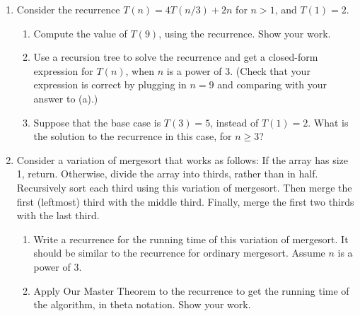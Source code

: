 \documentclass{article}
\begin{document}
\begin{enumerate}
    \item Consider the recurrence $T(n) = 4T(n/3) + 2n$ for $n > 1$, and $T(1) = 2$.
    \begin{enumerate}
        \item Compute the value of $T(9)$, using the recurrence. Show your work.
        \item Use a recursion tree to solve the recurrence and get a closed-form expression for $T(n)$, when $n$ is a power of 3. (Check that your expression is correct by plugging in $n = 9$ and comparing with your answer to (a).)
        \item Suppose that the base case is $T(3) = 5$, instead of $T(1) = 2$. What is the solution to the recurrence in this case, for $n \ge 3$?
    \end{enumerate}

    \item Consider a variation of mergesort that works as follows: If the array has size 1, return. Otherwise, divide the array into thirds, rather than in half. Recursively sort each third using this variation of mergesort. Then merge the first (leftmost) third with the middle third. Finally, merge the first two thirds with the last third.
    \begin{enumerate}
        \item Write a recurrence for the running time of this variation of mergesort. It should be similar to the recurrence for ordinary mergesort. Assume $n$ is a power of 3.
        \item Apply Our Master Theorem to the recurrence to get the running time of the algorithm, in theta notation. Show your work.
    \end{enumerate}


\end{enumerate}
\end{document}
